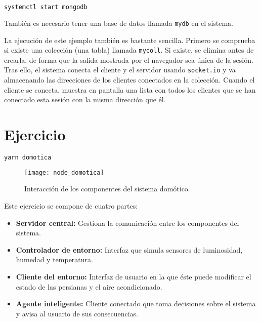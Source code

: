 \begin{lstlisting}[language=sh]
systemctl start mongodb
\end{lstlisting}

También es necesario tener una base de datos llamada \texttt{mydb} en el sistema.

La ejecución de este ejemplo también es bastante sencilla.
Primero se comprueba si existe una colección (una tabla) llamada \texttt{mycoll}.
Si existe, se elimina antes de crearla, de forma que la salida mostrada por el navegador sea única de la sesión.
Tras ello, el sistema conecta el cliente y el servidor usando \texttt{socket.io} y va almacenando las direcciones de los clientes conectados en la colección.
Cuando el cliente se conecta, muestra en pantalla una lista con todos los clientes que se han conectado esta sesión con la misma dirección que él.

\section{Ejercicio}

\begin{lstlisting}[language=sh]
yarn domotica
\end{lstlisting}

\begin{figure}[!ht]
\begin{center}
	\texttt{[image: node\_domotica]}
\end{center}
\caption{Interacción de los componentes del sistema domótico.}
\end{figure}

Este ejercicio se compone de cuatro partes:

\begin{itemize}
	\item\textbf{Servidor central:}
		Gestiona la comunicación entre los componentes del sistema.
	\item\textbf{Controlador de entorno:}
		Interfaz que simula sensores de luminosidad, humedad y temperatura.
	\item\textbf{Cliente del entorno:}
		Interfaz de usuario en la que éste puede modificar el estado de las persianas y el aire acondicionado.
	\item\textbf{Agente inteligente:}
		Cliente conectado que toma decisiones sobre el sistema y avisa al usuario de sus consecuencias.
\end{itemize}

\pagebreak

